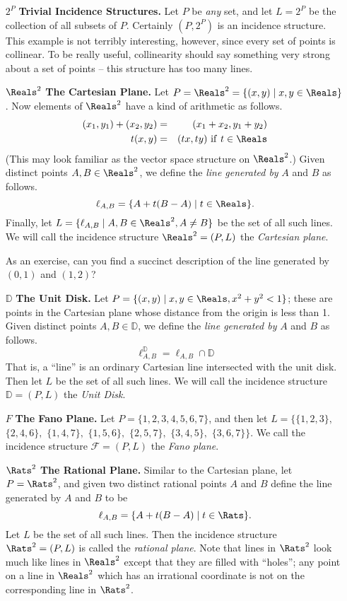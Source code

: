 \documentclass{article}
\begin{document}
\begin{itemize}
\item[$2^P$] \textbf{Trivial Incidence Structures.} Let $P$ be \emph{any} set, and let $L = 2^P$ be the collection of all subsets of $P$. Certainly $(P, 2^P)$ is an incidence structure. This example is not terribly interesting, however, since every set of points is collinear. To be really useful, collinearity should say something very strong about a set of points -- this structure has too many lines.


\item[$\Reals^2$] \textbf{The Cartesian Plane.} Let $P = \Reals^2 = \{ (x,y) \mid x,y \in \Reals \}$. Now elements of $\Reals^2$ have a kind of arithmetic as follows.
\begin{eqnarray*}
(x_1, y_1) + (x_2, y_2) & = & (x_1 + x_2, y_1 + y_2) \\
t(x,y) & = & (tx, ty)\ \mathrm{if}\ t \in \Reals
\end{eqnarray*}
(This may look familiar as the vector space structure on $\Reals^2$.) Given distinct points $A,B \in \Reals^2$, we define the \emph{line generated by} $A$ and $B$ as follows. \[ \ell_{A,B} = \{ A + t(B-A) \mid t \in \Reals \}. \] Finally, let $L = \{ \ell_{A,B} \mid A,B \in \Reals^2, A \neq B \}$ be the set of all such lines. We will call the incidence structure $\Reals^2 = (P,L)$ the \emph{Cartesian plane}.

As an exercise, can you find a succinct description of the line generated by $(0,1)$ and $(1,2)$?


\item[$\mathbb{D}$] \textbf{The Unit Disk.} Let $P = \{ (x,y) \mid x,y \in \Reals, x^2 + y^2 < 1 \}$; these are points in the Cartesian plane whose distance from the origin is less than 1. Given distinct points $A,B \in \mathbb{D}$, we define the \emph{line generated by} $A$ and $B$ as follows. \[ \ell_{A,B}^\mathbb{D} = \ell_{A,B} \cap \mathbb{D} \] That is, a ``line'' is an ordinary Cartesian line intersected with the unit disk. Then let $L$ be the set of all such lines. We will call the incidence structure $\mathbb{D} = (P,L)$ the \emph{Unit Disk}.


\item[$F$] \textbf{The Fano Plane.} Let $P = \{1,2,3,4,5,6,7\}$, and then let $L = \{\{1,2,3\},$ $\{2,4,6\},$ $\{1,4,7\},$ $\{1,5,6\},$ $\{2,5,7\},$ $\{3,4,5\},$ $\{3,6,7\}\}$. We call the incidence structure $\mathcal{F} = (P,L)$ the \emph{Fano plane}.


\item[$\Rats^2$] \textbf{The Rational Plane.} Similar to the Cartesian plane, let $P = \Rats^2$, and given two distinct rational points $A$ and $B$ define the line generated by $A$ and $B$ to be \[\ell_{A,B} = \{ A + t(B-A) \mid t \in \Rats \}. \] Let $L$ be the set of all such lines. Then the incidence structure $\Rats^2 = (P,L)$ is called the \emph{rational plane}. Note that lines in $\Rats^2$ look much like lines in $\Reals^2$ except that they are filled with ``holes''; any point on a line in $\Reals^2$ which has an irrational coordinate is not on the corresponding line in $\Rats^2$.



\end{itemize}
\end{document}
